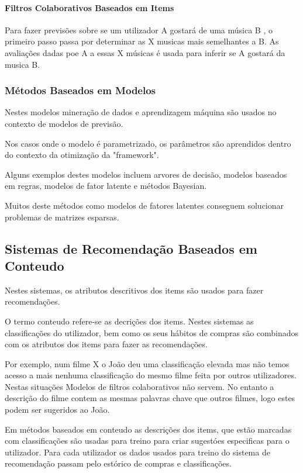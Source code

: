 \hfill
\paragraph{ Filtros Colaborativos Baseados em Items}
\hfill
 \par Para fazer previsões sobre se um utilizador A gostará de uma música B , o primeiro passo passa por determinar as X musicas mais semelhantes a B. As avaliações dadas poe A a essas X músicas é usada para inferir se A gostará da musica B.

\hfill
\subsubsection{Métodos Baseados em Modelos}
\hfill
\par Nestes modelos mineração de dados e aprendizagem máquina são usados no contexto de modelos de previsão.
\par Nos casos onde o modelo é parametrizado, os parâmetros são aprendidos dentro do contexto da otimização da "framework".
\par Alguns exemplos destes modelos incluem arvores de decisão, modelos baseados em regras, modelos de fator latente e métodos Bayesian.

\par Muitos deste métodos como modelos de fatores latentes conseguem solucionar problemas de matrizes esparsas.

\hfill
\subsection{Sistemas de Recomendação Baseados em Conteudo}
\hfill
\par Nestes sistemas, os atributos descritivos dos items são usados para fazer recomendações.
\par O termo conteudo refere-se as decrições dos items. Nestes sistemas as classificações do utilizador, bem como os seus hábitos de compras são combinados com os atributos dos items para fazer as recomendações. 
\par Por exemplo, num filme X o João deu uma classificação elevada mas não temos acesso a mais nenhuma classificação do mesmo filme feita por outros utilizadores. Nestas situações Modelos de filtros colaborativos não servem. No entanto a descrição do filme contem as mesmas palavras chave que outros filmes, logo estes podem ser sugeridos ao João.
\par Em métodos baseados em conteudo as descrições dos items, que estão marcadas com classificações são usadas para treino para criar sugestóes especificas para o utilizador. Para cada utilizador os dados usados para treino do sistema de recomendação passam pelo estórico de compras e classificações.\newline


